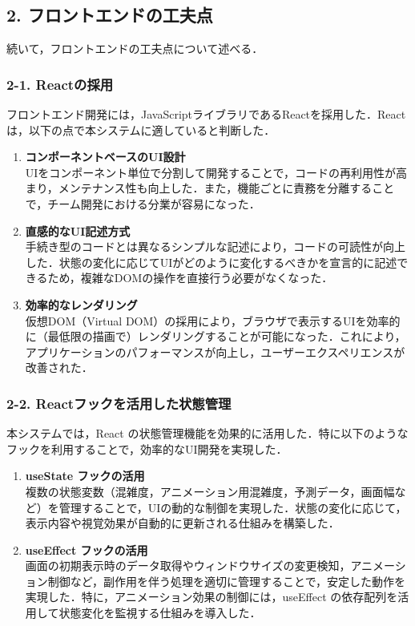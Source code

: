 \subsection*{2. フロントエンドの工夫点}

続いて，フロントエンドの工夫点について述べる．

\subsubsection*{2-1. Reactの採用}
フロントエンド開発には，JavaScriptライブラリであるReactを採用した．Reactは，以下の点で本システムに適していると判断した．

\begin{enumerate}
	\item {\bfseries コンポーネントベースのUI設計}\\
	UIをコンポーネント単位で分割して開発することで，コードの再利用性が高まり，メンテナンス性も向上した．また，機能ごとに責務を分離することで，チーム開発における分業が容易になった．
		
	\item {\bfseries 直感的なUI記述方式}\\
	手続き型のコードとは異なるシンプルな記述により，コードの可読性が向上した．状態の変化に応じてUIがどのように変化するべきかを宣言的に記述できるため，複雑なDOMの操作を直接行う必要がなくなった．
		
	\item {\bfseries 効率的なレンダリング}\\
	仮想DOM（Virtual DOM）の採用により，ブラウザで表示するUIを効率的に（最低限の描画で）レンダリングすることが可能になった．これにより，アプリケーションのパフォーマンスが向上し，ユーザーエクスペリエンスが改善された．
\end{enumerate}

\subsubsection*{2-2. Reactフックを活用した状態管理}
本システムでは，React の状態管理機能を効果的に活用した．特に以下のようなフックを利用することで，効率的なUI開発を実現した．

\begin{enumerate}

	\item {\bfseries useState フックの活用}\\
	複数の状態変数（混雑度，アニメーション用混雑度，予測データ，画面幅など）を管理することで，UIの動的な制御を実現した．状態の変化に応じて，表示内容や視覚効果が自動的に更新される仕組みを構築した．
	
	\item {\bfseries useEffect フックの活用}\\
	画面の初期表示時のデータ取得やウィンドウサイズの変更検知，アニメーション制御など，副作用を伴う処理を適切に管理することで，安定した動作を実現した．特に，アニメーション効果の制御には，useEffect の依存配列を活用して状態変化を監視する仕組みを導入した．
\end{enumerate}



